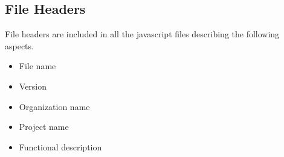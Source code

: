 \documentclass[11pt]{article}
\begin{document}
	\subsection{File Headers}
	File headers are included in all the javascript files describing the following aspects.
	\begin{itemize}
		\item File name
		\item Version
		\item Organization name
		\item Project name                                                                                                                                                                                                                                                                                                                                                                                                                                                                                                                                                                                                                                                                                                                                                                                                                                                                                                                                                                                                                                                                                                                                                                                                                                                                                                                                                                                                                                                                                                                                                                                                                                                                                                                                                                                                                                                                                                                                                                                                                                                                                                                                                                                                                                                                                                                                                                                                                                                                         
		\item Functional description
	\end{itemize}
	
\end{document}

